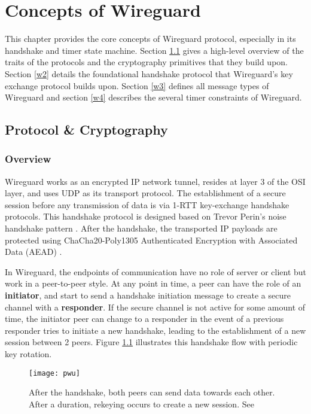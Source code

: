 \chapter{Concepts of Wireguard} \label{chap:wireguard}
  This chapter provides the core concepts of Wireguard protocol, especially in its handshake
  and timer state machine. Section \ref{w1} gives a high-level overview of the traits of the
  protocols and the cryptography primitives that they build upon. 
  Section \ref{w2}  details the foundational handshake protocol that Wireguard's
  key exchange protocol builds upon. Section \ref{w3} defines all message types of Wireguard and
  section \ref{w4} describes the several timer constraints of Wireguard.
\section{Protocol \& Cryptography} \label{w1}
\subsection{Overview}
 Wireguard works as an encrypted IP network tunnel, resides at layer 3 of the OSI layer, and
 uses UDP as its transport protocol. The establishment of a secure session before any 
 transmission of data is via 1-RTT key-exchange handshake protocols. This handshake protocol
 is designed based on Trevor Perin's noise handshake pattern \cite{noise}. After the handshake, the  
 transported IP payloads are protected using ChaCha20-Poly1305 Authenticated Encryption with 
 Associated Data (AEAD) \cite{rfc8439}.

 In Wireguard, the endpoints of communication have no role of server or client but work in a
 peer-to-peer style. At any point in time, a peer can have the role of an \textbf{initiator}, and start to send 
 a handshake initiation message to create a secure channel with a \textbf{responder}. If the secure channel
 is not active for some amount of time, the initiator peer can change to a responder in the event of
 a previous responder tries to initiate a new handshake, leading to the establishment of a new session
 between 2 peers. Figure \ref{fig:pwu_hs} illustrates this handshake flow with periodic key rotation.

\begin{figure}[h]
  \centering
  \texttt{[image: pwu]}
  \caption{After the handshake, both peers can send data towards each other. After a duration, rekeying occurs to create a new session. See \cite[p.~7]{pwu}}
  \label{fig:pwu_hs}
\end{figure}


